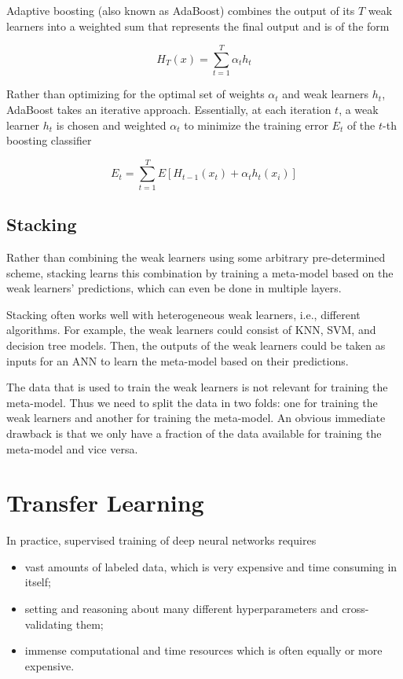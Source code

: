 Adaptive boosting (also known as AdaBoost) \cite{adaboost} combines the output of its $T$ weak learners into a weighted sum that represents the final output and is of the form

$$
H_T(x) = \sum_{t=1}^{T} \alpha_t h_t
$$

Rather than optimizing for the optimal set of weights $\alpha_t$ and weak learners $h_t$, AdaBoost takes an iterative approach. Essentially, at each iteration $t$, a weak learner $h_t$ is chosen and weighted $\alpha_t$ to minimize the training error $E_t$ of the $t$-th boosting classifier

$$
E_t = \sum_{t=1}^{T} E[H_{t-1}(x_t) + \alpha_t h_t(x_i)]
$$

\subsection{Stacking}

Rather than combining the weak learners using some arbitrary pre-determined scheme, stacking learns this combination by training a meta-model based on the weak learners' predictions, which can even be done in multiple layers.

Stacking often works well with heterogeneous weak learners, i.e., different algorithms. For example, the weak learners could consist of \ac{KNN}, \ac{SVM}, and decision tree models. Then, the outputs of the weak learners could be taken as inputs for an \ac{ANN} to learn the meta-model based on their predictions.

The data that is used to train the weak learners is not relevant for training the meta-model. Thus we need to split the data in two folds: one for training the weak learners and another for training the meta-model. An obvious immediate drawback is that we only have a fraction of the data available for training the meta-model and vice versa.

\section{Transfer Learning}
\label{section:transferlearning}

In practice, supervised training of deep neural networks requires

\begin{itemize}
    \item vast amounts of labeled data, which is very expensive and time consuming in itself;
    \item setting and reasoning about many different hyperparameters and cross-validating them;
    \item immense computational and time resources which is often equally or more expensive.
\end{itemize}

